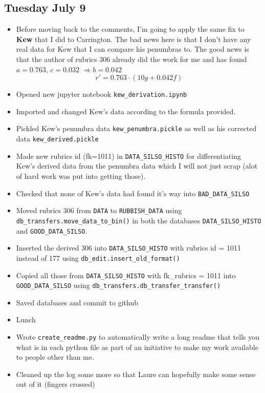 \documentclass[12pt]{article}
\newcommand{\RA}{\Rightarrow}
\begin{document}
\subsection{Tuesday July 9}
\begin{itemize}
    \item Before moving back to the comments, I'm going to apply the same fix to \textbf{Kew} that I did to Carrington. The bad news here is that I don't have any real data for Kew that I can compare his penumbras to. The good news is that the author of rubrics 306 already did the work for me and has found $a = 0.763$, $c = 0.032$ $\RA b = 0.042$
    $$r' = 0.763 \cdot (10 g + 0.042 f)$$
    \item Opened new jupyter notebook \texttt{kew\_derivation.ipynb}
    \item Imported and changed Kew's data according to the formula provided.
    \item Pickled Kew's penumbra data \texttt{kew\_penumbra.pickle} as well as his corrected data \texttt{kew\_derived.pickle}
    \item Made new rubrics id (fk=1011) in \texttt{DATA\_SILSO\_HISTO} for differentiating Kew's derived data from the penumbra data which I will not just scrap (alot of hard work was put into getting those).
    \item Checked that none of Kew's data had found it's way into \texttt{BAD\_DATA\_SILSO}
    \item Moved rubrics 306 from \texttt{DATA} to \texttt{RUBBISH\_DATA} using \texttt{db\_transfers.move\_data\_to\_bin()} in both the databases \texttt{DATA\_SILSO\_HISTO} and \texttt{GOOD\_DATA\_SILSO}.
    \item Inserted the derived 306 into \texttt{DATA\_SILSO\_HISTO} with rubrics id = 1011 instead of 177 using \texttt{db\_edit.insert\_old\_format()}
    \item Copied all those from \texttt{DATA\_SILSO\_HISTO} with fk\_rubrics = 1011 into \texttt{GOOD\_DATA\_SILSO} using \texttt{db\_transfers.db\_transfer\_transfer()}
    \item Saved databases and commit to github
    \item Lunch
    \item Wrote \texttt{create\_readme.py} to automatically write a long readme that tells you what is in each python file as part of an initiative to make my work available to people other than me.
    \item Cleaned up the log some more so that Laure can hopefully make some sense out of it (fingers crossed)

\end{itemize}
\end{document}
